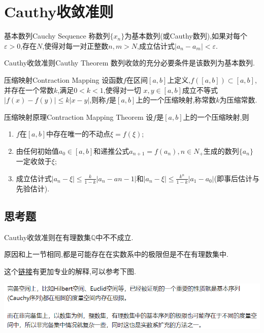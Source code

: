 \documentclass[cn,chinese,fontset]{elegantbook}
\begin{document}
    \section{Cauthy收敛准则}
        
        \begin{definition}{基本数列}{Cauchy Sequence}
            称数列$\{x_n\}$为基本数列(或Cauthy数列),如果对每个$\varepsilon>0$,存在$N$,使得对每一对正整数$n,m>N$,成立估计式$\lvert a_n-a_m\rvert<\varepsilon$.
        \end{definition}
        
        \begin{theorem}{Cauthy收敛准则}{Cauthy Theorem} 
            数列收敛的充分必要条件是该数列为基本数列.
        \end{theorem}
        
        \begin{definition}{压缩映射}{Contraction Mapping}
            设函数$f$在区间$[a,b]$上定义,$f([a,b])\subset [a,b]$,并存在一个常数$k$,满足$0<k<1$,使得对一切 $x,y\in [a,b]$成立不等式$\lvert f(x)-f(y)\rvert\leqslant k\lvert x-y\rvert$,则称$f$是$[a,b]$上的一个压缩映射,称常数$k$为压缩常数.
        \end{definition}
        \begin{theorem}{压缩映射原理}{Contraction Mapping Theorem}
            设$f$是$[a,b]$上的一个压缩映射,则
            \begin{enumerate}
                \item $f$在$[a,b]$中存在唯一的不动点$\xi=f(\xi)$;
                \item 由任何初始值$a_0\in[a,b]$和递推公式$a_{n+1}=f(a_n),n\in N_+$生成的数列$\{a_n\}$一定收敛于$\xi$;
                \item 成立估计式$\lvert a_n-\xi\rvert\leqslant\frac{k}{1-k}\lvert a_n-a{n-1}\rvert$和$\lvert a_n-\xi\rvert\leqslant\frac{k^n}{1-k}\lvert a_1-a_0\rvert$(即事后估计与先验估计).
            \end{enumerate}
        \end{theorem}
            \subsection{思考题}
            \begin{example}
                Cauthy收敛准则在有理数集$\mathbb{Q}$中不不成立.
            \end{example}
            \begin{solution}
                原因和上一节相同,都是可能存在在实数系中的极限但是不在有理数集中.

                这个\href{https://www.zhihu.com/question/50995932/answer/866173110}{链接}有更加专业的解释,可以参考下图.

                \includegraphics[width=0.8\linewidth]{第三章 实数系的基本定理/3.4 Cauthy收敛准则/Cauthy收敛准则在Q中不成立.png}
            \end{solution}
        
\end{document}
